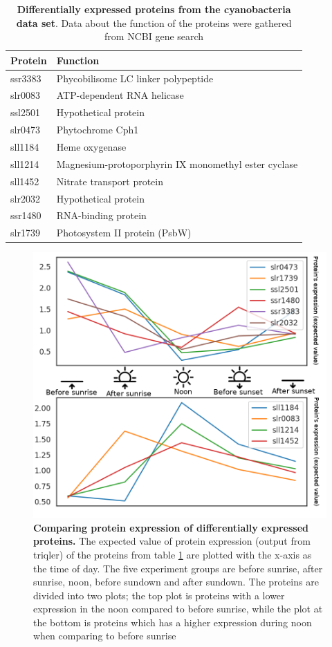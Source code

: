 \begin{center}
\begin{table}[H]
\caption{\textbf{Differentially expressed proteins from the cyanobacteria data set}. Data about the function of the proteins were gathered from NCBI gene search \cite{ncbi-search}}
\begin{tabular}{ l l }
\toprule
Protein & Function \\ \midrule
ssr3383 & Phycobilisome LC linker polypeptide \\ [0.5ex]
slr0083 & ATP-dependent RNA helicase \\ [0.5ex]
ssl2501 & Hypothetical protein \\ [0.5ex]
slr0473 & Phytochrome Cph1 \\ [0.5ex]
sll1184 & Heme oxygenase \\ [0.5ex]
sll1214 & Magnesium-protoporphyrin IX monomethyl ester cyclase \\ [0.5ex]
sll1452 & Nitrate transport protein \\ [0.5ex]
slr2032 & Hypothetical protein \\ [0.5ex]
ssr1480 & RNA-binding protein \\ [0.5ex]
slr1739 & Photosystem II protein (PsbW) \\ \bottomrule
\end{tabular}
\centering
\label{table:cyano-proteins}
\end{table}
\end{center}

\begin{figure}[H]
  \begin{center}
  \includegraphics[width=0.8\linewidth]{results/combined_edited.png}
  \caption{\textbf{Comparing protein expression of differentially expressed proteins.} The expected value of protein expression (output from triqler) of the proteins from table \ref{table:cyano-proteins} are plotted with the x-axis as the time of day. The five experiment groups are before sunrise, after sunrise, noon, before sundown and after sundown. The proteins are divided into two plots; the top plot is proteins with a lower expression in the noon compared to before sunrise, while the plot at the bottom is proteins which has a higher expression during noon when comparing to before sunrise}
  \label{fig:expression}
  \end{center}
\end{figure}

